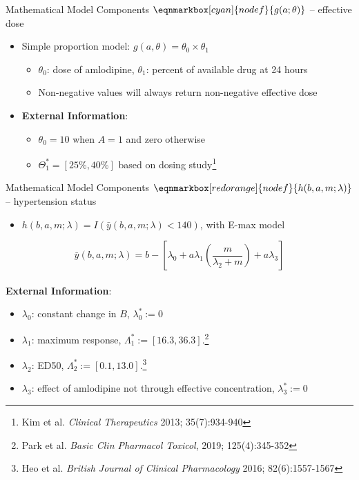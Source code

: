 \documentclass[aspectratio=169]{beamer}
\begin{document}
\begin{frame}{Mathematical Model Components}
	$\eqnmarkbox[cyan]{nodef}{g(a; \theta)}$ -- effective dose
	\begin{itemize}
		\item Simple proportion model: $g(a,\theta) = \theta_0 \times \theta_1$
		\begin{itemize}
			\item $\theta_0$: dose of amlodipine, $\theta_1$: percent of available drug at 24 hours
			\item Non-negative values will always return non-negative effective dose
		\end{itemize}
		\item \textbf{External Information}: 
		\begin{itemize}
			\item $\theta_0 = 10$ when $A=1$ and zero otherwise
			\item $\Theta_1^* = [25\%, 40\%]$ based on dosing study\footnote[frame]{Kim et al. \textit{Clinical Therapeutics} 2013; 35(7):934-940}
		\end{itemize}
	\end{itemize}
\end{frame}

\begin{frame}{Mathematical Model Components}
	$\eqnmarkbox[redorange]{nodef}{h(b,a,m;\lambda)}$ -- hypertension status
	\begin{itemize}
		\item $h(b,a,m;\lambda) = I\left(\bar{y}(b,a,m; \lambda) < 140\right)$, with E-max model
	\end{itemize}
	\begin{equation*}
		\bar{y}(b,a,m; \lambda) = b - \left[ \lambda_0 + a \lambda_1 \left( \frac{m}{\lambda_2 + m} \right) + a \lambda_3 \right]
	\end{equation*}	
	~\\
	\textbf{External Information}:
	\begin{itemize}
		\item $\lambda_0$: constant change in $B$, $\lambda^*_0 := 0$
		\item $\lambda_1$: maximum response, $\Lambda^*_1 := [16.3, 36.3]$.\footnote[frame]{Park et al. \textit{ Basic Clin Pharmacol Toxicol}, 2019; 125(4):345-352}
		\item $\lambda_2$: ED50, $\Lambda^*_2 := [0.1, 13.0]$.\footnote[frame]{Heo et al. \textit{British Journal of Clinical Pharmacology} 2016; 82(6):1557-1567}
		\item $\lambda_3$: effect of amlodipine not through effective concentration, $\lambda^*_3 := 0$
	\end{itemize}
\end{frame}
\end{document}
